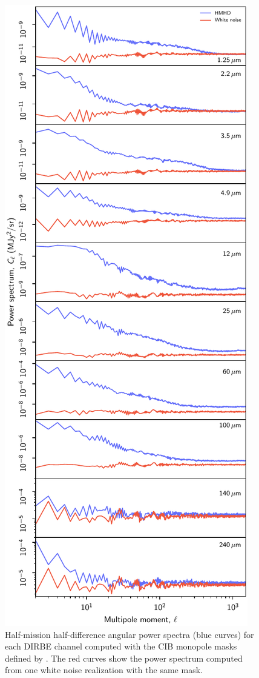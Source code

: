 \documentclass{aa}
\begin{document}
       \begin{figure}
	 \centering
	 \includegraphics[width=\columnwidth]{figs/cls_DR2_hmhd_v1.pdf}
	 \caption{Half-mission half-difference angular power spectra (blue curves) for each DIRBE channel computed with the CIB monopole masks defined by \citet{CG02_03}. The red curves show the power spectrum computed from one white noise realization with the same mask.}
	 \label{fig:hmhd_powspec}
       \end{figure}
\end{document}
